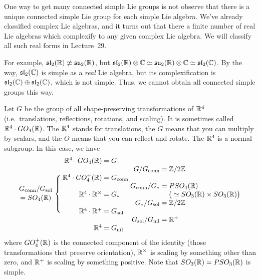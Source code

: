 One way to get many connected simple Lie groups is not observe that there is a unique
 connected simple Lie group for each simple Lie algebra. We've already classified
 complex Lie algebras, and it turns out that there a finite number of real Lie
 algebras which complexify to any given complex Lie algebra. We will classify all such
 real forms in Lecture~29.

 For example, $\mathfrak{sl}_2(\mathbb{R})\not\simeq \mathfrak{su}_2(\mathbb{R})$, but $\mathfrak{sl}_2(\mathbb{R})\otimes \mathbb{C}
 \simeq \mathfrak{su}_2(\mathbb{R})\otimes \mathbb{C} \simeq \mathfrak{sl}_2(\mathbb{C})$. By the way, $\mathfrak{sl}_2(\mathbb{C})$
 is simple as a \emph{real} Lie algebra, but its complexification is $\mathfrak{sl}_2(\mathbb{C})\oplus
 \mathfrak{sl}_2(\mathbb{C})$, which is not simple. Thus, we cannot obtain all connected simple groups
 this way.
 \begin{example}
   Let $G$ be the group of all shape-preserving transformations of $\mathbb{R}^4$ (i.e.\
   translations, reflections, rotations, and scaling). It is sometimes called
   $\mathbb{R}^4\cdot\nobreak GO_4(\mathbb{R})$. The $\mathbb{R}^4$ stands for translations, the $G$ means
   that you can multiply by scalars, and the $O$ means that you can reflect and
   rotate. The $\mathbb{R}^4$ is a normal subgroup.  In this case, we have
   \[
     \renewcommand\arraycolsep{.3ex}
     \raisebox{-.4\baselineskip}{\shortstack{$G_\text{conn}/G_\text{sol}$\\ $=SO_4(\RR)$}}
     \raisebox{.1\baselineskip}{
       $\left\{ \rule{0pt}{2.6\baselineskip} \right.$}
     \begin{array}{rl}
      \RR^4\cdot GO_4(\RR) &= G\\ \\
      \RR^4\cdot GO_4^+(\RR) &= G_\text{conn}\\ \\
      \RR^4\cdot \RR^\times &= G_*\\ \\
      \RR^4\cdot \RR^+ &= G_\text{sol} \\ \\
      \RR^4 &= G_\text{nil}
    \end{array}
    \begin{array}{rl}
      G/G_\text{conn} &= \ZZ/2\ZZ\\ \\
      G_\text{conn}/G_* &= PSO_4(\RR) \\
       & \quad \big(\simeq SO_3(\RR)\times SO_3(\RR)\big)\\
      G_*/G_\text{sol} &= \ZZ/2\ZZ \\ \\
      G_\text{sol}/G_\text{nil} &=\RR^+
    \end{array}
  \]
  where $GO_4^+(\mathbb{R})$ is the connected component of the identity (those
  transformations that preserve orientation), $\mathbb{R}^\times$ is scaling by something
  other than zero, and $\mathbb{R}^+$ is scaling by something positive. Note that
  $SO_3(\mathbb{R}) = PSO_3(\mathbb{R})$ is simple.


\end{example}
